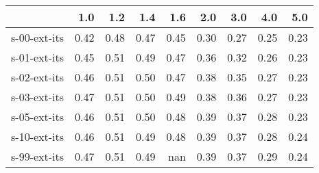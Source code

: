 \begin{tabular}{lrrrrrrrr}
\toprule
{} &  1.0 &  1.2 &  1.4 &  1.6 &  2.0 &  3.0 &  4.0 &  5.0 \\
\midrule
s-00-ext-its & 0.42 & 0.48 & 0.47 & 0.45 & 0.30 & 0.27 & 0.25 & 0.23 \\
s-01-ext-its & 0.45 & 0.51 & 0.49 & 0.47 & 0.36 & 0.32 & 0.26 & 0.23 \\
s-02-ext-its & 0.46 & 0.51 & 0.50 & 0.47 & 0.38 & 0.35 & 0.27 & 0.23 \\
s-03-ext-its & 0.47 & 0.51 & 0.50 & 0.49 & 0.38 & 0.36 & 0.27 & 0.23 \\
s-05-ext-its & 0.46 & 0.51 & 0.50 & 0.48 & 0.39 & 0.37 & 0.28 & 0.23 \\
s-10-ext-its & 0.46 & 0.51 & 0.49 & 0.48 & 0.39 & 0.37 & 0.28 & 0.24 \\
s-99-ext-its & 0.47 & 0.51 & 0.49 &  nan & 0.39 & 0.37 & 0.29 & 0.24 \\
\bottomrule
\end{tabular}
